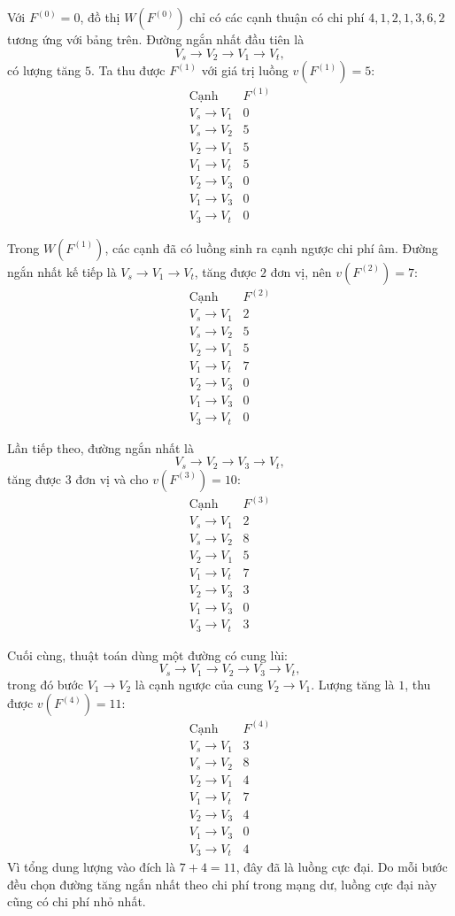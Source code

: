 \documentclass[11pt]{article}
\begin{document}
Với $F^{(0)}=0$, đồ thị $W(F^{(0)})$ chỉ có các cạnh thuận có chi phí
$4,1,2,1,3,6,2$ tương ứng với bảng trên. Đường ngắn nhất đầu tiên là
\[
  V_s\to V_2\to V_1\to V_t,
\]
có lượng tăng $5$. Ta thu được $F^{(1)}$ với giá trị luồng $v(F^{(1)})=5$:
\[
\begin{array}{c|c}
\text{Cạnh} & F^{(1)}\\ \hline
V_s\to V_1 & 0\\
V_s\to V_2 & 5\\
V_2\to V_1 & 5\\
V_1\to V_t & 5\\
V_2\to V_3 & 0\\
V_1\to V_3 & 0\\
V_3\to V_t & 0
\end{array}
\]

Trong $W(F^{(1)})$, các cạnh đã có luồng sinh ra cạnh ngược chi phí âm. Đường
ngắn nhất kế tiếp là $V_s\to V_1\to V_t$, tăng được $2$ đơn vị, nên
$v(F^{(2)})=7$:
\[
\begin{array}{c|c}
\text{Cạnh} & F^{(2)}\\ \hline
V_s\to V_1 & 2\\
V_s\to V_2 & 5\\
V_2\to V_1 & 5\\
V_1\to V_t & 7\\
V_2\to V_3 & 0\\
V_1\to V_3 & 0\\
V_3\to V_t & 0
\end{array}
\]

Lần tiếp theo, đường ngắn nhất là
\[
  V_s\to V_2\to V_3\to V_t,
\]
tăng được $3$ đơn vị và cho $v(F^{(3)})=10$:
\[
\begin{array}{c|c}
\text{Cạnh} & F^{(3)}\\ \hline
V_s\to V_1 & 2\\
V_s\to V_2 & 8\\
V_2\to V_1 & 5\\
V_1\to V_t & 7\\
V_2\to V_3 & 3\\
V_1\to V_3 & 0\\
V_3\to V_t & 3
\end{array}
\]

Cuối cùng, thuật toán dùng một đường có cung lùi:
\[
  V_s\to V_1\to V_2\to V_3\to V_t,
\]
trong đó bước $V_1\to V_2$ là cạnh ngược của cung $V_2\to V_1$. Lượng tăng là
$1$, thu được $v(F^{(4)})=11$:
\[
\begin{array}{c|c}
\text{Cạnh} & F^{(4)}\\ \hline
V_s\to V_1 & 3\\
V_s\to V_2 & 8\\
V_2\to V_1 & 4\\
V_1\to V_t & 7\\
V_2\to V_3 & 4\\
V_1\to V_3 & 0\\
V_3\to V_t & 4
\end{array}
\]
Vì tổng dung lượng vào đích là $7+4=11$, đây đã là luồng cực đại. Do mỗi bước
đều chọn đường tăng ngắn nhất theo chi phí trong mạng dư, luồng cực đại này
cũng có chi phí nhỏ nhất.
\end{document}
